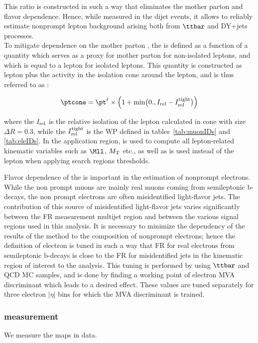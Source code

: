 This ratio is constructed in such a way that eliminates the mother parton \pt and flavor dependence.
Hence, while measured in the dijet events, it allows to reliably estimate nonprompt lepton background
arising both from $\ttbar$ and DY+jets processes. \\
To mitigate \fr dependence on the mother parton \pt, the \fr is defined as a function
of a quantity which serves as a proxy for mother parton \pt for non-isolated leptons, and which
is equal to a lepton \pt for isolated leptons. This quantity is
constructed as lepton \pt plus 
the activity in the isolation cone around the lepton, and is thus referred to as \ptcone:

\begin{equation}
\ptcone = \pt^\ell\times\Bigl(1+ \min\bigl(0., \Irel - \Irel^\text{tight}\bigr) \Bigr)
\end{equation}

\noindent where the $I_{\mathrm{rel}}$ is the relative isolation of the lepton calculated in cone with size $\Delta R=0.3$, while the $I_{\mathrm{rel}}^\text{tight}$ is the \ti  WP defined in tables~\ref{tab:muonIDs} and \ref{tab:eleIDs}.
In the application region, \ptcone is used to compute all lepton-related kinematic variables
such as $\Mll$, $M_{\mathrm{T}}$ etc., as well as is used instead of the lepton \pt when applying 
search regions \pt thresholds.

Flavor dependence of the \fr is important in the estimation of
nonprompt electrons. While the non prompt muons are mainly real muons
coming from semileptonic b-decays, the non prompt electrons are often
misidentified light-flavor jets. The contribution of this source of misidentified light-flavor jets varies significantly between 
the FR measurement multijet region and between the various signal
regions used in this analysis. It is necessary to minimize the
dependency of the results of the method to the composition of
nonprompt electrons; hence the definition
of \lo electron is tuned in such a way that FR for real electrons from semileptonic b-decays
is close to the FR for misidentified jets in the kinematic region of interest to the analysis. 
This tuning is performed by using $\ttbar$ and QCD MC samples, and is
done by finding a working point of 
electron MVA discriminant which leads to a desired effect. These values are tuned separately 
for three electron $|\eta|$ bins for which the MVA discriminant is
trained. 

\subsubsection{\fr measurement} \label{sec:singleFR}
We measure the \fr maps in data.

